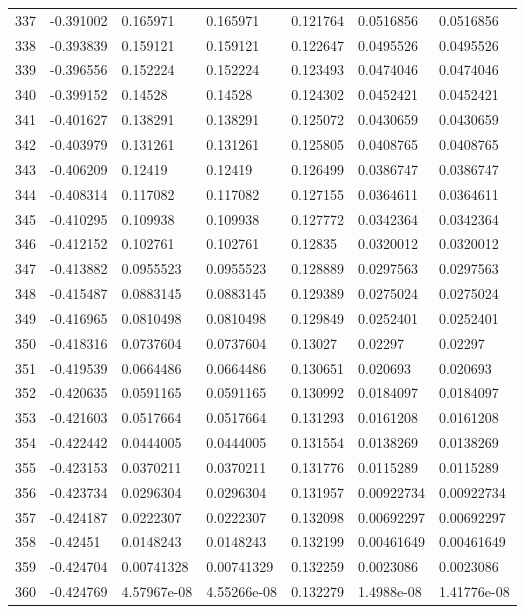 \begin{longtable}{l|lll|lll}
 337 & -0.391002    & 0.165971    & 0.165971    &  0.121764    & 0.0516856   & 0.0516856   \\
 338 & -0.393839    & 0.159121    & 0.159121    &  0.122647    & 0.0495526   & 0.0495526   \\
 339 & -0.396556    & 0.152224    & 0.152224    &  0.123493    & 0.0474046   & 0.0474046   \\
 340 & -0.399152    & 0.14528     & 0.14528     &  0.124302    & 0.0452421   & 0.0452421   \\
 341 & -0.401627    & 0.138291    & 0.138291    &  0.125072    & 0.0430659   & 0.0430659   \\
 342 & -0.403979    & 0.131261    & 0.131261    &  0.125805    & 0.0408765   & 0.0408765   \\
 343 & -0.406209    & 0.12419     & 0.12419     &  0.126499    & 0.0386747   & 0.0386747   \\
 344 & -0.408314    & 0.117082    & 0.117082    &  0.127155    & 0.0364611   & 0.0364611   \\
 345 & -0.410295    & 0.109938    & 0.109938    &  0.127772    & 0.0342364   & 0.0342364   \\
 346 & -0.412152    & 0.102761    & 0.102761    &  0.12835     & 0.0320012   & 0.0320012   \\
 347 & -0.413882    & 0.0955523   & 0.0955523   &  0.128889    & 0.0297563   & 0.0297563   \\
 348 & -0.415487    & 0.0883145   & 0.0883145   &  0.129389    & 0.0275024   & 0.0275024   \\
 349 & -0.416965    & 0.0810498   & 0.0810498   &  0.129849    & 0.0252401   & 0.0252401   \\
 350 & -0.418316    & 0.0737604   & 0.0737604   &  0.13027     & 0.02297     & 0.02297     \\
 351 & -0.419539    & 0.0664486   & 0.0664486   &  0.130651    & 0.020693    & 0.020693    \\
 352 & -0.420635    & 0.0591165   & 0.0591165   &  0.130992    & 0.0184097   & 0.0184097   \\
 353 & -0.421603    & 0.0517664   & 0.0517664   &  0.131293    & 0.0161208   & 0.0161208   \\
 354 & -0.422442    & 0.0444005   & 0.0444005   &  0.131554    & 0.0138269   & 0.0138269   \\
 355 & -0.423153    & 0.0370211   & 0.0370211   &  0.131776    & 0.0115289   & 0.0115289   \\
 356 & -0.423734    & 0.0296304   & 0.0296304   &  0.131957    & 0.00922734  & 0.00922734  \\
 357 & -0.424187    & 0.0222307   & 0.0222307   &  0.132098    & 0.00692297  & 0.00692297  \\
 358 & -0.42451     & 0.0148243   & 0.0148243   &  0.132199    & 0.00461649  & 0.00461649  \\
 359 & -0.424704    & 0.00741328  & 0.00741329  &  0.132259    & 0.0023086   & 0.0023086   \\
 360 & -0.424769    & 4.57967e-08 & 4.55266e-08 &  0.132279    & 1.4988e-08  & 1.41776e-08 \\
\hline
\end{longtable}



